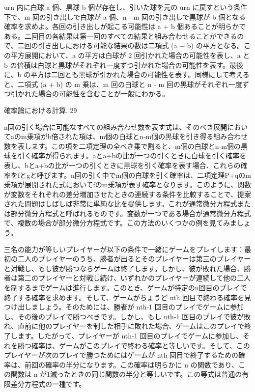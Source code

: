 \documentclass[a4paper,11pt,openany]{ltjsbook}
\begin{document}
urn 内に白球 a 個、黒球 b 個が存在し、引いた球を元の urn に戻すという条件下で、m 回の引き出しで白球が a 個、n - m 回の引き出しで黒球が b 個となる確率を求めよ。各回の引き出しが起こる可能性は a + b 個あることが明らかである。二回目の各結果は第一回のすべての結果と組み合わせることができるので、二回の引き出しにおける可能な結果の数は二項式 (a + b) の平方となる。この平方展開において、a の平方は白球が 2 回引かれた場合の可能性を表し、a と b の倍積は白球と黒球がそれぞれ一度ずつ引かれた場合の可能性を表す。最後に、b の平方は二回とも黒球が引かれた場合の可能性を表す。同様にして考えると、二項式 (a + b) の m 乗は、m 回の白球と n - m 回の黒球がそれぞれ一度ずつ引かれた場合の可能性を含むことが一般にわかる。

確率論における計算. 29

n回の引く場合に可能なすべての組み合わせ数を表す式は、そのべき展開においてaのm乗項がb倍された項は、m個の白球とn-m個の黒球を引き得る組み合わせ数を表します。この項を二項定理の全べき乗で割ると、m個の白球とn-m個の黒球を引く確率が得られます。aとa+bの比が一つの引くときに白球を引く確率を表し、bとa+bの比が一つの引くときに黒球を引く確率を表す場合、これらの確率をfとgと呼びます。n回の引く中でm個の白球を引く確率は、二項定理P+qのm乗項が展開された式においてfのm乗項が表す確率となります。このように、関数が変数をそれぞれの差分増加させたときの連続する条件を比較することで、提案された問題はしばしば非常に単純な比を提供します。これが通常微分方程式または部分微分方程式と呼ばれるものです。変数が一つである場合が通常微分方程式で、複数の場合が部分微分方程式です。この方法のいくつかの例を見てみましょう。

三名の能力が等しいプレイヤーが以下の条件で一緒にゲームをプレイします：最初の二人のプレイヤーのうち、勝者が出るとそのプレイヤーは第三のプレイヤーと対戦し、もし彼が勝つならゲームは終了します。しかし、彼が敗れた場合、勝者は第二のプレイヤーと対戦し続け、いずれかのプレイヤーが連続して他の二人を制するまでゲームは進行します。このとき、ゲームが特定のn回目のプレイで終了する確率を求めます。そして、ゲームがちょうど nth 回目で終わる確率を見つけ出しましょう。そのためには、勝者が nth-1 回目のプレイでゲームに参加し、その後のプレイで勝つべきです。しかし、もし nth-1 回目のプレイで彼が敗れ、直前に他のプレイヤーを制した相手に敗れた場合、ゲームはこのプレイで終了します。したがって、プレイヤーが nth-1 回目のプレイでゲームに参加し、それを勝つ確率は、ゲームがこのプレイで終わる確率と等しいです。そして、このプレイヤーが次のプレイで勝つためにはゲームが nth 回目で終了するための確率は、前回の確率の半分になります。この確率は明らかに n の関数であり、この関数は n が1減ったときの同じ関数の半分と等しいです。この等式は普通の有限差分方程式の一種です。
\end{document}
